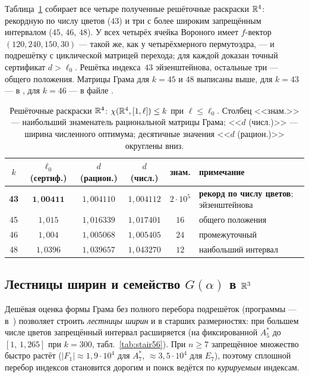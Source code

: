Таблица~\ref{tab:r4} собирает все четыре полученные решёточные раскраски
$\mathbb{R}^4$: рекордную по числу цветов ($43$) и три с более широким запрещённым
интервалом ($45$, $46$, $48$). У всех четырёх ячейка Вороного имеет $f$-вектор
$(120,240,150,30)$ --- такой же, как у четырёхмерного пермутоэдра, --- и
подрешётку с циклической матрицей перехода; для каждой доказан точный
сертификат $d>\ell_0$. Решётка индекса~$43$ эйзенштейнова, остальные три ---
общего положения. Матрицы Грама для $k=45$ и $48$ выписаны выше, для $k=43$ ---
в \cite{Bounds}, для $k=46$ --- в файле .

\begin{table}[h]
\centering
\caption{Решёточные раскраски $\mathbb{R}^4$: $\chi(\mathbb{R}^4,[1,\ell])\le k$ при
$\ell\le\ell_0$. Столбец <<знам.>> --- наибольший знаменатель рациональной
матрицы Грама; <<$d$ (числ.)>> --- ширина численного оптимума; десятичные
значения <<$d$ (рацион.)>> округлены вниз.}
\label{tab:r4}
\small
\begin{tabular}{c c c c c l}
\toprule
$k$ & $\ell_0$ (сертиф.) & $d$ (рацион.) & $d$ (числ.) & знам. & примечание\\
\midrule
\textbf{43} & $\mathbf{1{,}00411}$ & $1{,}004110$ & $1{,}004112$ & $2\cdot10^5$
  & \textbf{рекорд по числу цветов}; эйзенштейнова~\cite{Bounds}\\
45 & $1{,}015$ & $1{,}016339$ & $1{,}017401$ & $16$ & общего положения\\
46 & $1{,}004$ & $1{,}005068$ & $1{,}005405$ & $24$ & промежуточный\\
48 & $1{,}0396$ & $1{,}039657$ & $1{,}043270$ & $12$ & наибольший интервал\\
\bottomrule
\end{tabular}
\end{table}

\subsection{Лестницы ширин и семейство $G(\alpha)$ в $\mathbb{R}^3$}\label{sec:stair}

Дешёвая оценка формы Грама без полного перебора подрешёток
(программы --- в~\cite{Repo}) позволяет строить \emph{лестницы ширин}
и в старших размерностях: при большем числе цветов запрещённый интервал
расширяется (на фиксированной $A_5^*$ до $[1,\,1{,}265]$ при $k=300$,
табл.~\ref{tab:stair56}). При $n\ge7$ запрещённое множество быстро растёт
($|F_1|\approx1{,}9\cdot10^4$ для $A_7^*$,
${\approx}3{,}5\cdot10^4$ для $E_7$), поэтому сплошной перебор индексов
становится дорогим и поиск ведётся по \emph{курируемым} индексам.

